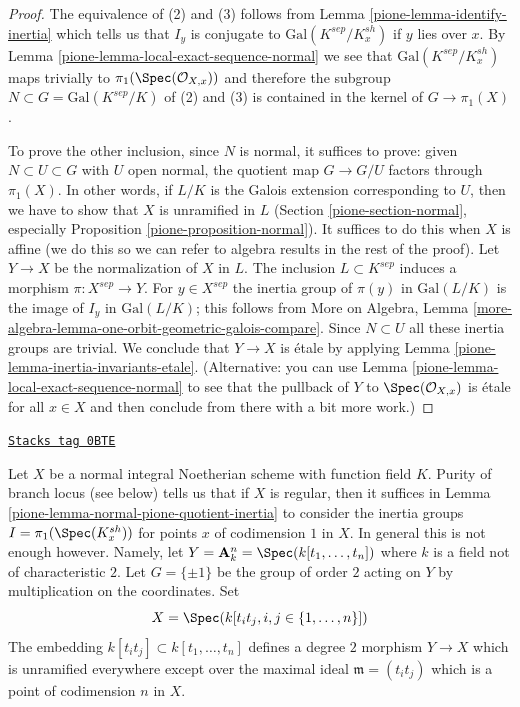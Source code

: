 \begin{proof}

The equivalence of (2) and (3) follows from
Lemma \ref{pione-lemma-identify-inertia}
which tells us that $I_y$ is conjugate to $\text{Gal}(K^{sep}/K_x^{sh})$
if $y$ lies over $x$. By Lemma \ref{pione-lemma-local-exact-sequence-normal}
we see that $\text{Gal}(K^{sep}/K_x^{sh})$ maps trivially to
$\pi_1(\Spec(\mathcal{O}_{X, x}))$ and therefore the subgroup
$N \subset G = \text{Gal}(K^{sep}/K)$
of (2) and (3) is contained in the kernel of
$G \longrightarrow \pi_1(X)$.

\medskip\noindent
To prove the other inclusion, since $N$ is normal, it suffices to prove:
given $N \subset U \subset G$ with $U$ open normal,
the quotient map $G \to G/U$ factors through $\pi_1(X)$.
In other words, if $L/K$ is the Galois extension corresponding
to $U$, then we have to show that $X$ is unramified in $L$
(Section \ref{pione-section-normal}, especially
Proposition \ref{pione-proposition-normal}).
It suffices to do this when $X$ is affine (we do this
so we can refer to algebra results in the rest of the proof).
Let $Y \to X$ be the normalization of $X$ in $L$.
The inclusion $L \subset K^{sep}$ induces a morphism
$\pi : X^{sep} \to Y$. For $y \in X^{sep}$
the inertia group of $\pi(y)$ in $\text{Gal}(L/K)$
is the image of $I_y$ in $\text{Gal}(L/K)$; this follows
from More on Algebra, Lemma
\ref{more-algebra-lemma-one-orbit-geometric-galois-compare}.
Since $N \subset U$ all these inertia groups are trivial.
We conclude that $Y \to X$ is \'etale by applying
Lemma \ref{pione-lemma-inertia-invariants-etale}.
(Alternative: you can use Lemma \ref{pione-lemma-local-exact-sequence-normal}
to see that the pullback of $Y$ to $\Spec(\mathcal{O}_{X, x})$ is
\'etale for all $x \in X$ and then conclude from there
with a bit more work.)
\end{proof}

\begin{example}
\label{pione-example-bigger-codim}
\href{https://stacks.math.columbia.edu/tag/0BTE}{\texttt{Stacks tag 0BTE}}

Let $X$ be a normal integral Noetherian scheme with function field $K$.
Purity of branch locus (see below) tells us that if $X$ is regular, then
it suffices in Lemma \ref{pione-lemma-normal-pione-quotient-inertia}
to consider the inertia groups $I = \pi_1(\Spec(K_x^{sh}))$
for points $x$ of codimension $1$ in $X$.
In general this is not enough however. Namely, let
$Y = \mathbf{A}_k^n = \Spec(k[t_1, \ldots, t_n])$
where $k$ is a field not of characteristic $2$.
Let $G = \{\pm 1\}$ be the group of order $2$ acting on $Y$
by multiplication on the coordinates. Set
$$
X = \Spec(k[t_it_j, i, j \in \{1, \ldots, n\}])
$$
The embedding $k[t_it_j] \subset k[t_1, \ldots, t_n]$
defines a degree $2$ morphism $Y \to X$ which is unramified everywhere
except over the maximal ideal $\mathfrak m = (t_it_j)$
which is a point of codimension $n$ in $X$.
\end{example}

